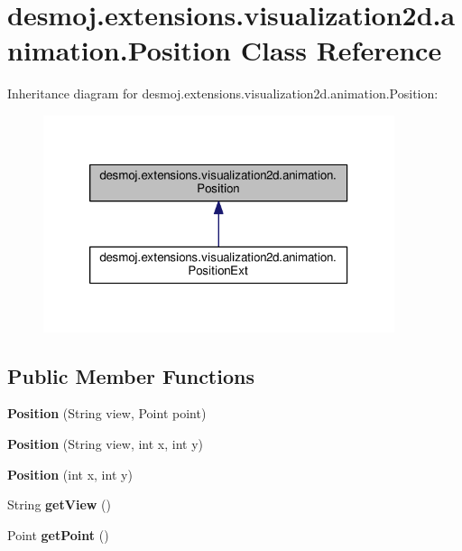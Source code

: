 \section{desmoj.\-extensions.\-visualization2d.\-animation.\-Position Class Reference}
\label{classdesmoj_1_1extensions_1_1visualization2d_1_1animation_1_1_position}


Inheritance diagram for desmoj.\-extensions.\-visualization2d.\-animation.\-Position\-:
\nopagebreak
\begin{figure}[H]
\begin{center}
\leavevmode
\includegraphics[width=292pt]{classdesmoj_1_1extensions_1_1visualization2d_1_1animation_1_1_position__inherit__graph}
\end{center}
\end{figure}
\subsection*{Public Member Functions}
\begin{DoxyCompactItemize}
\item 
{\bf Position} (String view, Point point)
\item 
{\bfseries Position} (String view, int x, int y)\label{classdesmoj_1_1extensions_1_1visualization2d_1_1animation_1_1_position_a20e96b0e0ed2e5db6bd7a266ef61a3ba}

\item 
{\bfseries Position} (int x, int y)\label{classdesmoj_1_1extensions_1_1visualization2d_1_1animation_1_1_position_a5aa6fe10c29c4a023d84bbe61c833bbb}

\item 
String {\bfseries get\-View} ()\label{classdesmoj_1_1extensions_1_1visualization2d_1_1animation_1_1_position_aa32383763f102eb57200a49b09b4a403}

\item 
Point {\bfseries get\-Point} ()\label{classdesmoj_1_1extensions_1_1visualization2d_1_1animation_1_1_position_a926301392847a3c4a660eafdd8cbbde0}

\end{DoxyCompactItemize}


